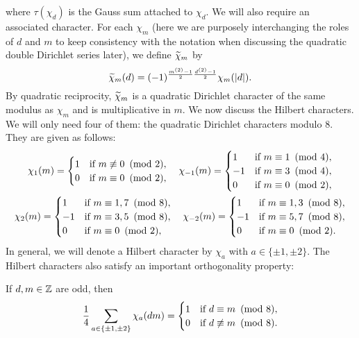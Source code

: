 \documentclass[12pt,reqno,oneside]{amsart}
\begin{document}
    where $\tau(\chi_{d})$ is the Gauss sum attached to $\chi_{d}$. We will also require an associated character. For each $\chi_{m}$ (here we are purposely interchanging the roles of $d$ and $m$ to keep consistency with the notation when discussing the quadratic double Dirichlet series later), we define $\widetilde{\chi}_{m}$ by
    \[
        \widetilde{\chi}_{m}(d) = (-1)^{\frac{m^{(2)}-1}{2}\frac{d^{(2)}-1}{2}}\chi_{m}(|d|).
    \]
    By quadratic reciprocity, $\widetilde{\chi}_{m}$ is a quadratic Dirichlet character of the same modulus as $\chi_{m}$ and is multiplicative in $m$. We now discuss the Hilbert characters. We will only need four of them: the quadratic Dirichlet characters modulo $8$. They are given as follows:
    \begin{gather*}
        \chi_{1}(m) = \begin{cases} 1 &\text{if $m \not\equiv 0 \ \left(\text{mod }2\right)$}, \\ 0 &\text{if $m \equiv 0 \ \left(\text{mod }2\right)$}, \end{cases} \quad \chi_{-1}(m) = \begin{cases} 1 &\text{if $m \equiv 1 \ \left(\text{mod }4\right)$}, \\ -1 &\text{if $m \equiv 3 \ \left(\text{mod }4\right)$}, \\ 0 &\text{if $m \equiv 0 \ \left(\text{mod }2\right)$}, \end{cases} \\ \chi_{2}(m) = \begin{cases} 1 &\text{if $m \equiv 1,7 \ \left(\text{mod }8\right)$}, \\ -1 &\text{if $m \equiv 3,5 \ \left(\text{mod }8\right)$}, \\ 0 &\text{if $m \equiv 0 \ \left(\text{mod }2\right)$}, \end{cases} \quad \chi_{-2}(m) = \begin{cases} 1 &\text{if $m \equiv 1,3 \ \left(\text{mod }8\right)$}, \\ -1 &\text{if $m \equiv 5,7 \ \left(\text{mod }8\right)$}, \\ 0 &\text{if $m \equiv 0 \ \left(\text{mod }2\right)$}. \end{cases}
    \end{gather*}
    In general, we will denote a Hilbert character by $\chi_{a}$ with $a \in \{\pm1,\pm2\}$. The Hilbert characters also satisfy an important orthogonality property:

    \begin{theorem}
        If $d,m \in \mathbb{Z}$ are odd, then
        \[
            \frac{1}{4}\sum_{a \in \{\pm1,\pm2\}}\chi_{a}(dm) = \begin{cases} 1 & \text{if $d \equiv m \ \left(\text{mod }8\right)$}, \\ 0 & \text{if $d \not\equiv m \ \left(\text{mod }8\right)$}. \end{cases}
        \]
    \end{theorem}
\end{document}
